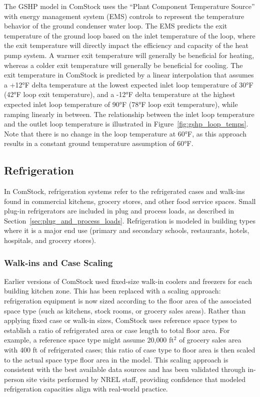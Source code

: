 The GSHP model in ComStock uses the ``Plant Component Temperature Source'' with energy management system (EMS) controls to represent the temperature behavior of the ground condenser water loop. The EMS predicts the exit temperature of the ground loop based on the inlet temperature of the loop, where the exit temperature will directly impact the efficiency and capacity of the heat pump system. A warmer exit temperature will generally be beneficial for heating, whereas a colder exit temperature will generally be beneficial for cooling. The exit temperature in ComStock is predicted by a linear interpolation that assumes a +12°F delta temperature at the lowest expected inlet loop temperature of 30°F (42°F loop exit temperature), and a -12°F delta temperature at the highest expected inlet loop temperature of 90°F (78°F loop exit temperature), while ramping linearly in between. The relationship between the inlet loop temperature and the outlet loop temperature is illustrated in Figure~\ref{fig:gshp_loop_temps}. Note that there is no change in the loop temperature at 60°F, as this approach results in a constant ground temperature assumption of 60°F.

\subsection{Refrigeration}
\label{sec:refrigeration}

In ComStock, refrigeration systems refer to the refrigerated cases and walk-ins found in commercial kitchens, grocery stores, and other food service spaces. Small plug-in refrigerators are included in plug and process loads, as described in Section~\ref{sec:plug_and_process_loads}. Refrigeration is modeled in building types where it is a major end use (primary and secondary schools, restaurants, hotels, hospitals, and grocery stores).

\subsubsection{Walk-ins and Case Scaling}
Earlier versions of ComStock used fixed-size walk-in coolers and freezers for each building kitchen zone. This has been replaced with a scaling approach: refrigeration equipment is now sized according to the floor area of the associated space type (such as kitchens, stock rooms, or grocery sales areas). Rather than applying fixed case or walk-in sizes, ComStock uses reference space types to establish a ratio of refrigerated area or case length to total floor area. For example, a reference space type might assume 20{,}000 ft$^2$ of grocery sales area with 400 ft of refrigerated cases; this ratio of case type to floor area is then scaled to the actual space type floor area in the model. This scaling approach is consistent with the best available data sources and has been validated through in-person site visits performed by NREL staff, providing confidence that modeled refrigeration capacities align with real-world practice.

